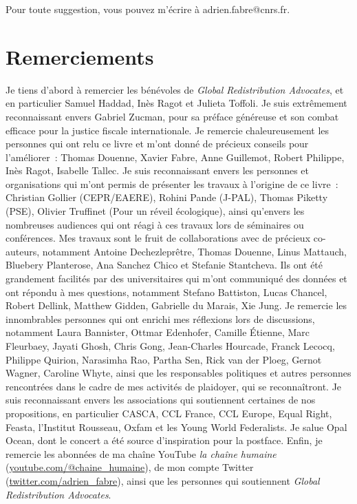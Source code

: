 \documentclass[a5paper,french,openany]{memoir}
\begin{document}
Pour toute suggestion, vous pouvez m'écrire à adrien.fabre@cnrs.fr.

\renewcommand{\url}[1]{\href{#1}{Lien}} %
{\small 

}

\clearpage
\section*{Remerciements}\label{sec:merci} 
Je tiens d'abord à remercier les bénévoles de \textit{Global Redistribution Advocates}, et en particulier Samuel Haddad, Inès Ragot et Julieta Toffoli. Je suis extrêmement reconnaissant envers Gabriel Zucman, pour sa préface généreuse et son combat efficace pour la justice fiscale internationale. Je remercie chaleureusement les personnes qui ont relu ce livre et m'ont donné de précieux conseils pour l'améliorer~: Thomas Douenne, Xavier Fabre, Anne Guillemot, Robert Philippe, Inès Ragot, Isabelle Tallec. Je suis reconnaissant envers les personnes et organisations qui m'ont permis de présenter les travaux à l'origine de ce livre~: Christian Gollier (CEPR/EAERE), Rohini Pande (J-PAL), Thomas Piketty (PSE), Olivier Truffinet (Pour un réveil écologique), ainsi qu'envers les nombreuses audiences qui ont réagi à ces travaux lors de séminaires ou conférences. Mes travaux sont le fruit de collaborations avec de précieux co-auteurs, notamment Antoine Dechezleprêtre, Thomas Douenne, Linus Mattauch, Bluebery Planterose, Ana Sanchez Chico et Stefanie Stantcheva. 
Ils ont été grandement facilités par des universitaires qui m'ont communiqué des données et ont répondu à mes questions, notamment Stefano Battiston, Lucas Chancel, Robert Dellink, Matthew Gidden, Gabrielle du Marais, Xie Jung. %
Je remercie les innombrables personnes qui ont enrichi mes réflexions lors de discussions, notamment Laura Bannister, Ottmar Edenhofer, Camille Étienne, Marc Fleurbaey, Jayati Ghosh, Chris Gong, Jean-Charles Hourcade, Franck Lecocq, Philippe Quirion, Narasimha Rao, Partha Sen, Rick van der Ploeg, Gernot Wagner, Caroline Whyte, ainsi que les responsables politiques et autres personnes rencontrées dans le cadre de mes activités de plaidoyer, qui se reconnaîtront. Je suis reconnaissant envers les associations qui soutiennent certaines de nos propositions, 
en particulier CASCA, CCL France, CCL Europe, Equal Right, Feasta, l'Institut Rousseau, Oxfam et les Young World Federalists. Je salue Opal Ocean, dont le concert a été source d'inspiration pour la postface. Enfin, je remercie les abonné\textperiodcentered{}e\textperiodcentered{}s de ma chaîne YouTube \textit{la chaîne humaine} (\href{https://www.youtube.com/@chaine_humaine}{youtube.com/@chaine\_humaine}), de mon compte Twitter (\href{https://twitter.com/adrien_fabre}{twitter.com/adrien\_fabre}), ainsi que les personnes qui soutiennent \textit{Global Redistribution Advocates}.

\pagebreak \vspace*{-2cm}
\listoftables \vspace{-1cm}
\listoffigures
\end{document}
